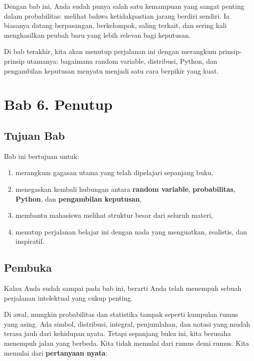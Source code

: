 \documentclass[
  letterpaper,
  DIV=11,
  numbers=noendperiod]{scrreprt}
\providecommand{\tightlist}{%
  \setlength{\itemsep}{0pt}\setlength{\parskip}{0pt}}
\begin{document}
Dengan bab ini, Anda sudah punya salah satu kemampuan yang sangat
penting dalam probabilitas: melihat bahwa ketidakpastian jarang berdiri
sendiri. Ia biasanya datang berpasangan, berkelompok, saling terkait,
dan sering kali menghasilkan peubah baru yang lebih relevan bagi
keputusan.

Di bab terakhir, kita akan menutup perjalanan ini dengan merangkum
prinsip-prinsip utamanya: bagaimana random variable, distribusi, Python,
dan pengambilan keputusan menyatu menjadi satu cara berpikir yang kuat.


\chapter{Bab 6. Penutup}\label{bab-6.-penutup}

\section{Tujuan Bab}\label{tujuan-bab-5}

Bab ini bertujuan untuk:

\begin{enumerate}
\def\labelenumi{\arabic{enumi}.}
\tightlist
\item
  merangkum gagasan utama yang telah dipelajari sepanjang buku,
\item
  menegaskan kembali hubungan antara \textbf{random variable},
  \textbf{probabilitas}, \textbf{Python}, dan \textbf{pengambilan
  keputusan},
\item
  membantu mahasiswa melihat struktur besar dari seluruh materi,
\item
  menutup perjalanan belajar ini dengan nada yang menguatkan, realistis,
  dan inspiratif.
\end{enumerate}

\section{Pembuka}\label{pembuka-5}

Kalau Anda sudah sampai pada bab ini, berarti Anda telah menempuh sebuah
perjalanan intelektual yang cukup penting.

Di awal, mungkin probabilitas dan statistika tampak seperti kumpulan
rumus yang asing. Ada simbol, distribusi, integral, penjumlahan, dan
notasi yang mudah terasa jauh dari kehidupan nyata. Tetapi sepanjang
buku ini, kita berusaha menempuh jalan yang berbeda. Kita tidak memulai
dari rumus demi rumus. Kita memulai dari \textbf{pertanyaan nyata}:
\end{document}
